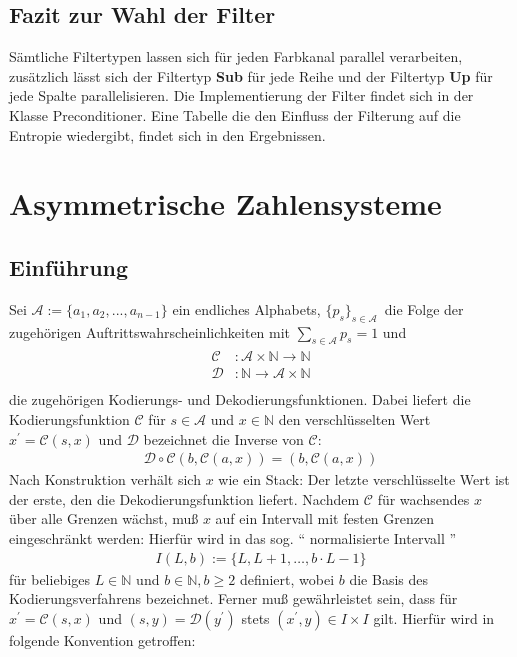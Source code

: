 \documentclass[a4paper,12pt]{article}
\newcommand{\N}{\mathbb N}
\newcommand{\A}{\mathcal A}
\newcommand{\C}{\mathcal C}
\newcommand{\D}{\mathcal D}
\begin{document}
\subsection{Fazit zur Wahl der Filter}
Sämtliche Filtertypen lassen sich für jeden Farbkanal parallel verarbeiten, zusätzlich lässt sich der Filtertyp \textbf{Sub} für jede Reihe und der Filtertyp \textbf{Up} für jede Spalte parallelisieren. Die Implementierung der Filter findet sich in der Klasse Preconditioner.  Eine Tabelle die den Einfluss der Filterung auf die Entropie wiedergibt, findet sich in den Ergebnissen.
\newpage
\section{Asymmetrische Zahlensysteme}\label{ANS}
\subsection{Einführung}
Sei $\A:=\{a_{1},a_{2},...,a_{n-1}\}$  ein endliches Alphabets, $\{p_{s}\}_{s\in \A}\, $ die Folge der zugehörigen Auftrittswahrscheinlichkeiten mit
$\sum_{s\in \A} p_{s} =1$ und
\begin{align*}
             \begin{array} {ccc}
              \C &:\A \times \N  \rightarrow  \N \\
             \D &: \N\rightarrow\A \times \N\\
              \end{array}
\end{align*}
die zugehörigen Kodierungs- und Dekodierungsfunktionen. Dabei liefert die Kodierungsfunktion $ \C$ für $s\in\A$ und $x\in \N$  den verschlüsselten Wert $x^{'} = \mathcal C(s,x)$ und $\D$ bezeichnet die Inverse von $\C$:
\begin{align*}
\D \circ \C  \left( b, \C(a,x)\right)  = (b, \C(a,x))
\end{align*}
Nach Konstruktion verhält sich $x$ wie ein Stack: Der letzte verschlüsselte Wert ist der erste, den die Dekodierungsfunktion liefert. Nachdem $\C$ für wachsendes $x$ über alle Grenzen wächst, muß $x$ auf ein Intervall mit festen Grenzen eingeschränkt werden: Hierfür wird in \cite{Duda} das sog. "` normalisierte Intervall "' 
\begin{align*}
I(L,b):=\{L,L+1,\ldots,b\cdot L-1\}
\end{align*}
für beliebiges $L \in \N$ und $b\in \N, b\geq 2$ definiert, wobei $b$ die Basis des Kodierungsverfahrens bezeichnet. Ferner muß gewährleistet sein, dass für $x^{'} = \C(s,x)$  und $(s,y) = \D(y^{'})$ stets $(x^{'}, y) \in I\times I$ gilt. Hierfür wird in \cite{Krajcevski} folgende Konvention getroffen:
\end{document}
